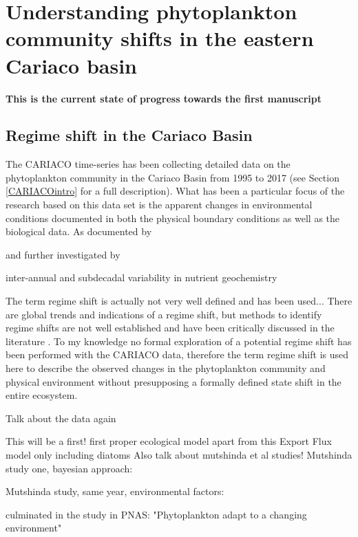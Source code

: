 \chapter{Understanding phytoplankton community shifts in the eastern Cariaco basin}

\small {\textbf{This is the current state of progress towards the first manuscript}}


\normalsize
\section{Regime shift in the Cariaco Basin}
The CARIACO time-series has been collecting detailed data on the phytoplankton community in the Cariaco Basin from 1995 to 2017 (see Section \ref{CARIACOintro} for a full description). What has been a particular focus of the research based on this data set is the apparent changes in environmental conditions documented in both the physical boundary conditions as well as the biological data. 
As documented by \citet{Taylor2012}

and further investigated by \citet{Pinckney2015}

inter-annual and subdecadal variability in nutrient geochemistry \citep{Scranton2014}



The term regime shift is actually not very well defined and has been used... \citep{DeYoung2004a}
There are global trends and indications of a regime shift, but methods to identify regime shifts are not well established and have been critically discussed in the literature \citep{Steele2004a, Mantua2004a, Litzow2016a}. To my knowledge no formal exploration of a potential regime shift has been performed with the CARIACO data, therefore the term regime shift is used here to describe the observed changes in the phytoplankton community and physical environment without presupposing a formally defined state shift in the entire ecosystem. 



Talk about the data again

This will be a first! first proper ecological model apart from this Export Flux model only including diatoms \citep{Walsh2002a}
Also talk about mutshinda et al studies!
Mutshinda study one, bayesian approach: \cite{Mutshinda2013a}

Mutshinda study, same year, environmental factors: \cite{Mutshinda2013}

culminated in the study in PNAS: "Phytoplankton adapt to a changing environment" \cite{Irwin2015}


